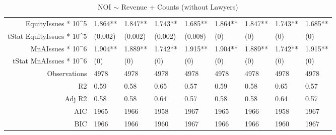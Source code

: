 \begin{table}[ht]
\begin{tabular}{rllllllll}
  EquityIssues * 10^5 & 1.864** & 1.847** & 1.743** & 1.685** & 1.864** & 1.847** & 1.743** & 1.685** \\ 
  tStat EquityIssues * 10^5 & (0.002) & (0.002) & (0.002) & (0.008) & (0) & (0) & (0) & (0) \\ 
  MnAIssues * 10^6 & 1.904** & 1.889** & 1.742** & 1.915** & 1.904** & 1.889** & 1.742** & 1.915** \\ 
  tStat MnAIssues * 10^6 & (0) & (0) & (0) & (0) & (0) & (0) & (0) & (0) \\ 
  Observations & 4978 & 4978 & 4978 & 4978 & 4978 & 4978 & 4978 & 4978 \\ 
  R2 & 0.59 & 0.58 & 0.65 & 0.57 & 0.59 & 0.58 & 0.65 & 0.57 \\ 
  Adj R2 & 0.58 & 0.58 & 0.64 & 0.57 & 0.58 & 0.58 & 0.64 & 0.57 \\ 
  AIC & 1965 & 1966 & 1958 & 1967 & 1965 & 1966 & 1958 & 1967 \\ 
  BIC & 1966 & 1966 & 1960 & 1967 & 1966 & 1966 & 1960 & 1967 \\ 
   \hline
\end{tabular}
\caption{NOI $\sim$ Revenue + Counts (without Lawyers)} 
\end{table}
